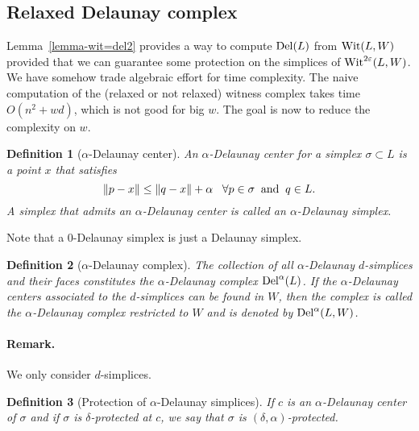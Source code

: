 \documentclass[11pt,a4paper]{article}
\newtheorem{definition}{Definition}
\newcommand{\e}{\varepsilon}
\newcommand{\del}{{\rm Del}}
\newcommand{\wit}{{\rm Wit}}
\begin{document}



\subsection{Relaxed Delaunay complex}

Lemma~\ref{lemma-wit=del2} provides a way to compute $\del (L)$ from
$\wit (L,W)$ provided that we can guarantee some protection on the
simplices of $\wit^{2\e}(L,W)$.  We have somehow trade algebraic
effort for time complexity. 
The naive computation of the (relaxed or not relaxed) witness complex
takes time $O(n^2+ wd)$, which is not good for big $w$.  The goal is now to reduce the complexity on $w$.

\begin{definition}[$\alpha$-Delaunay center]
An $\alpha$-Delaunay center for a simplex $\sigma\subset L$ is a
point $x$ that satisfies
\[ \| p-x\| \leq \| q-x\| + \alpha \;\;\; \forall p\in \sigma \;\;
{\rm and } \;\; q\in L.\]
A simplex that admits an $\alpha$-Delaunay center is called an
$\alpha$-Delaunay simplex.
\end{definition}

Note that a $0$-Delaunay simplex is just a Delaunay simplex.


\begin{definition}[$\alpha$-Delaunay complex]
The collection of all  $\alpha$-Delaunay 
$d$-simplices and their faces constitutes the
$\alpha$-Delaunay complex $\del^{\alpha}(L)$.
 If the
  $\alpha$-Delaunay centers associated to the $d$-simplices can be found in $W$, then the complex is called the
  $\alpha$-Delaunay complex restricted to $W$ and is denoted by $\del^{\alpha}(L,W)$.
\end{definition}

\paragraph{Remark.} We only consider $d$-simplices.


\begin{definition}[Protection of $\alpha$-Delaunay simplices]
If $c$ is an $\alpha$-Delaunay center of $\sigma$ and if $\sigma$ is
$\delta$-protected at $c$, we say that $\sigma$ is $(\delta, \alpha)$-protected.
\end{definition}
\end{document}
